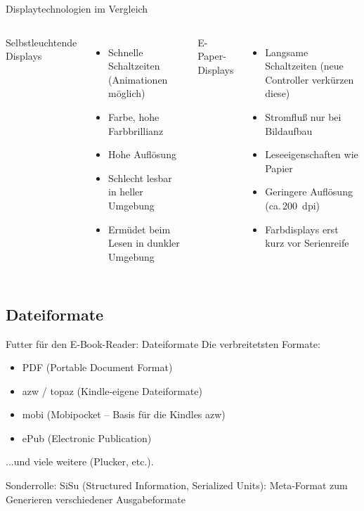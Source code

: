 \documentclass[hyperref={pdfpagelabels=false}]{beamer}
\begin{document}
\begin{frame}{Displaytechnologien im Vergleich}
	\begin{columns}
			Selbstleuchtende Displays

			\begin{itemize}
				\item Schnelle Schaltzeiten (Animationen möglich)
				\item Farbe, hohe Farbbrillianz
				\item Hohe Auflösung
				\item Schlecht lesbar in heller Umgebung
				\item Ermüdet beim Lesen in dunkler Umgebung
			\end{itemize}

			\vfill
			E-Paper-Displays

			\begin{itemize}
				\item Langsame Schaltzeiten (neue Controller verkürzen diese)
				\item Stromfluß nur bei Bildaufbau
				\item Leseeigenschaften wie Papier
				\item Geringere Auflösung (ca.\,200~dpi)
				\item Farbdisplays erst kurz vor Serienreife
			\end{itemize}

			\vfill
	\end{columns}
\end{frame}

\subsection{Dateiformate}

\begin{frame}{Futter für den E-Book-Reader: Dateiformate}
	Die verbreitetsten Formate:

	\begin{itemize}
		\item PDF (Portable Document Format)
		\item azw / topaz (Kindle-eigene Dateiformate)
		\item mobi (Mobipocket -- Basis für die Kindles azw)
		\item ePub (Electronic Publication)
	\end{itemize}

	...und viele weitere (Plucker, etc.).

	Sonderrolle: SiSu (Structured Information, Serialized Units): Meta-Format zum Generieren verschiedener Ausgabeformate
\end{frame}
\end{document}
